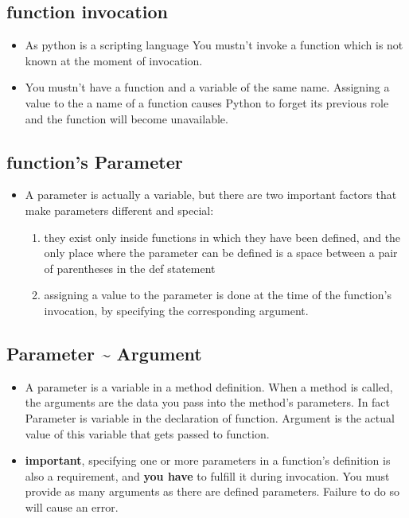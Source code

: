 \documentclass[11pt]{article}
\begin{document}
\subsection{function invocation}
\label{sec:org531a499}
\begin{itemize}
\item As python is a scripting language You mustn’t invoke a function
which is not known at the moment of invocation.
\item You mustn’t have a function and a variable of the same
name. Assigning a value to the a name of a function causes Python
to forget its previous role and the function will become
unavailable.
\end{itemize}
\subsection{function's Parameter}
\label{sec:orge3357fe}
\begin{itemize}
\item A parameter is actually a variable, but there are two important
factors that make parameters different and special:
\begin{enumerate}
\item they exist only inside functions in which they have been
defined, and the only place where the parameter can be
defined is a space between a pair of parentheses in the def
statement
\item assigning a value to the parameter is done at the time of the
function’s invocation, by specifying the corresponding
argument.
\end{enumerate}
\end{itemize}

\subsection{Parameter \textasciitilde{} Argument}
\label{sec:org9a9227d}
\begin{itemize}
\item A parameter is a variable in a method definition. When a method is
called, the arguments are the data you pass into the method's
parameters. In fact Parameter is variable in the declaration of
function. Argument is the actual value of this variable that gets
passed to function.
\item \textbf{important}, specifying one or more parameters in a function’s
definition is also a requirement, and \textbf{you have} to fulfill it during
invocation. You must provide as many arguments as there are defined
parameters. Failure to do so will cause an error.
\end{itemize}
\end{document}
